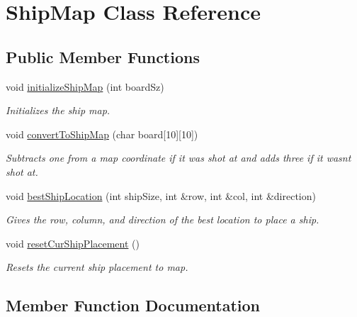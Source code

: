 \hypertarget{classShipMap}{}\section{Ship\+Map Class Reference}
\label{classShipMap}
\subsection*{Public Member Functions}
\begin{DoxyCompactItemize}
\item 
void \hyperlink{classShipMap_ac7f0f6945a93c1f8f33484795d71dbee}{initialize\+Ship\+Map} (int board\+Sz)
\begin{DoxyCompactList}\small\item\em Initializes the ship map. \end{DoxyCompactList}\item 
void \hyperlink{classShipMap_a4c701ef6bb9c0c64a13d2f11b0a23bf4}{convert\+To\+Ship\+Map} (char board\mbox{[}10\mbox{]}\mbox{[}10\mbox{]})
\begin{DoxyCompactList}\small\item\em Subtracts one from a map coordinate if it was shot at and adds three if it wasn\textquotesingle{}t shot at. \end{DoxyCompactList}\item 
void \hyperlink{classShipMap_aa554bb66e126e428c244c4a750b9cb73}{best\+Ship\+Location} (int ship\+Size, int \&row, int \&col, int \&direction)
\begin{DoxyCompactList}\small\item\em Gives the row, column, and direction of the best location to place a ship. \end{DoxyCompactList}\item 
void \hyperlink{classShipMap_a428edd83a927615914b42e168fd65f53}{reset\+Cur\+Ship\+Placement} ()\hypertarget{classShipMap_a428edd83a927615914b42e168fd65f53}{}\label{classShipMap_a428edd83a927615914b42e168fd65f53}

\begin{DoxyCompactList}\small\item\em Resets the current ship placement to map. \end{DoxyCompactList}\end{DoxyCompactItemize}


\subsection{Member Function Documentation}
